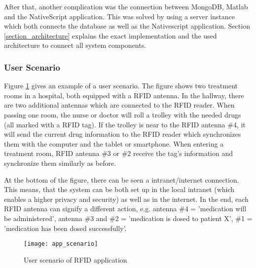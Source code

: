 After that, another complication was the connection between MongoDB, Matlab and the NativeScript application. This was solved by using a server instance which both connects the database as well as the Nativescript application. Section \ref{section_architecture} explains the exact implementation and the used architecture to connect all system components. 

\subsubsection{User Scenario}

Figure \ref{fig:appfunctionality} gives an example of a user scenario. The figure shows two treatment rooms in a hospital, both equipped with a RFID antenna. In the hallway, there are two additional antennas which are connected to the RFID reader. When passing one room, the nurse or doctor will roll a trolley with the needed drugs (all marked with a RFID tag). If the trolley is near to the RFID antenna \#4, it will send the current drug information to the RFID reader which synchronizes them with the computer and the tablet or smartphone. When entering a treatment room, RFID antenna \#3 or \#2 receive the tag's information and synchronize them similarly as before.

At the bottom of the figure, there can be seen a intranet/internet connection. This means, that the system can be both set up in the local intranet (which enables a higher privacy and security) as well as in the internet. In the end, each RFID antenna can signify a different action, e.g. antenna \#4 = 'medication will be administered', antenna \#3 and \#2 = 'medication is dosed to patient X', \#1 = 'medication has been dosed successfully'.

\begin{figure}
\centering
\texttt{[image: app\_scenario]} 
\caption{\label{fig:appfunctionality}User scenario of RFID application} 
\end{figure}

